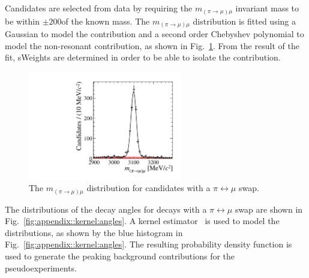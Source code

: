 Candidates are selected from data by requiring the $m_{(\pi\to\mu)\mu}$ invariant mass to be within $\pm200$\mevcc of the known \jpsi mass. The $m_{(\pi\to\mu)\mu}$ distribution is fitted using a Gaussian to model the \BdToJPsiKpi contribution and a second order Chebyshev polynomial to model the non-resonant contribution, as shown in Fig.~\ref{fig:appendix::kernel:massfit}. From the result of the fit, sWeights are determined in order to be able to isolate the \BdToJPsiKpi contribution.

\begin{figure}[!tb]
\centering
\includegraphics[width=0.6\textwidth]{figs/kpimm/selection/jpsi_pimu_fit.pdf}
\caption{The $m_{(\pi\to\mu)\mu}$ distribution for \BdToJPsiKpi candidates with a $\pi\leftrightarrow\mu$ swap.}
\label{fig:appendix::kernel:massfit}
\end{figure}

The distributions of the decay angles for \BdToJPsiKpi decays with a $\pi\leftrightarrow\mu$ swap are shown in Fig.~\ref{fig:appendix::kernel:angles}. A kernel estimator~\cite{kernel} is used to model the distributions, as shown by the blue histogram in Fig.~\ref{fig:appendix::kernel:angles}. The resulting probability density function is used to generate the peaking background contributions for the pseudoexperiments.

